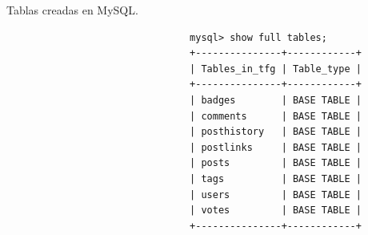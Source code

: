 \documentclass[a4paper, 12pt]{book}
\begin{document}
\begin{listing}[t]
    \caption{Tablas creadas en MySQL.}{}
    \label{lst:3}
    \centering
    \begin{verbatim}
                                mysql> show full tables;
                                +---------------+------------+
                                | Tables_in_tfg | Table_type |
                                +---------------+------------+
                                | badges        | BASE TABLE |
                                | comments      | BASE TABLE |
                                | posthistory   | BASE TABLE |
                                | postlinks     | BASE TABLE |
                                | posts         | BASE TABLE |
                                | tags          | BASE TABLE |
                                | users         | BASE TABLE |
                                | votes         | BASE TABLE |
                                +---------------+------------+
    \end{verbatim}
\end{listing}
\end{document}
